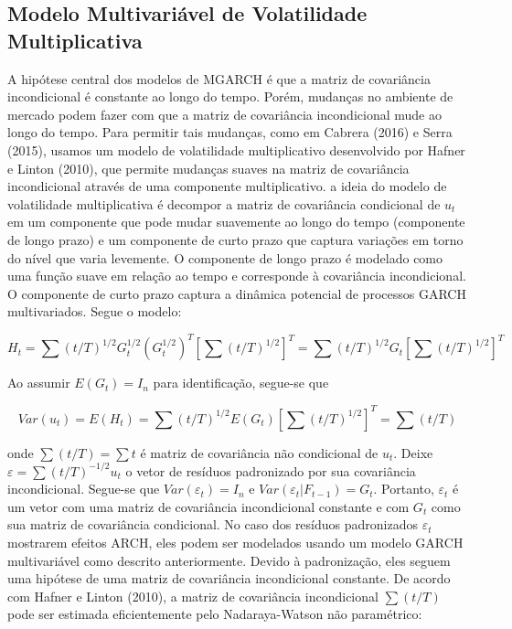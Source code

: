\documentclass[a4paper,12pt] {article}
\begin{document}
	
	 \subsection{Modelo Multivariável de Volatilidade Multiplicativa}	
	
	A hipótese central dos modelos de MGARCH é que a matriz de covariância incondicional é constante ao longo do tempo. Porém, mudanças no ambiente de mercado  podem fazer com que a matriz de covariância incondicional mude ao longo do tempo. Para permitir tais mudanças, como em Cabrera (2016) e Serra (2015),  usamos  um modelo de volatilidade multiplicativo desenvolvido por Hafner e Linton (2010), que permite mudanças suaves na matriz de covariância incondicional através de uma componente multiplicativo. a ideia do modelo de volatilidade multiplicativa é decompor a matriz de covariância condicional de $u_t$ em um componente que pode mudar suavemente ao longo do tempo (componente de longo prazo) e um componente  de curto prazo que captura variações em torno do nível que varia levemente. O componente de longo prazo é modelado como uma função suave em relação ao tempo e corresponde à covariância incondicional. O componente de curto prazo captura a dinâmica potencial de processos GARCH multivariados. Segue o modelo:
	
	\begin{equation}
	H_t=\sum (t/T)^{1/2} G_t^ {1/2} (G_t^{1/2})^T [\sum (t/T)^{1/2}]^T=\sum (t/T)^{1/2} G_t[\sum(t/T)^{1/2}]^T
	\end{equation}
	
	Ao assumir $E (G_t) = I_n$ para identificação, segue-se que
 	
 	\begin{equation}
 	Var(u_t)= E(H_t)= \sum (t/T)^{1/2} E(G_t)[\sum (t/T)^{1/2}]^T=\sum (t/T)
 	\end{equation}
 	
 	onde $\sum (t/T)=\sum{t}$ é matriz de covariância não condicional de $u_t$. Deixe $\varepsilon=\sum (t/T)^{-1/2}u_t$  o vetor de resíduos padronizado por sua covariância incondicional. Segue-se que $Var (\varepsilon_t) = I_n$ e $Var (\varepsilon_t | F_{t - 1}) = G_t$. Portanto, $\varepsilon_t$ é um vetor com uma matriz de covariância incondicional constante e com $G_t$ como sua matriz de covariância condicional. No caso dos resíduos padronizados $\varepsilon_t$ mostrarem efeitos ARCH, eles podem ser modelados usando um modelo GARCH multivariável como descrito anteriormente. Devido à padronização, eles seguem uma hipótese de uma matriz de covariância incondicional constante. De acordo com Hafner e Linton (2010), a matriz de covariância incondicional $\sum (t/T)$ pode ser estimada eficientemente pelo Nadaraya-Watson não paramétrico:
 	
\end{document}
